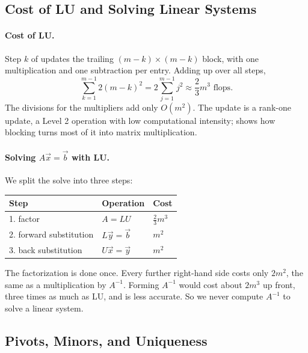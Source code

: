 \subsection{Cost of LU and Solving Linear Systems}

\paragraph{Cost of LU.} Step $k$ of  updates the trailing $(m - k) \times (m - k)$ block, with one multiplication and one subtraction per entry. Adding up over all steps,
\begin{equation}
  \sum_{k=1}^{m-1} 2(m - k)^2 = 2\sum_{j=1}^{m-1} j^2 \approx \frac{2}{3}m^3 \text{ flops.}
\end{equation}
The divisions for the multipliers add only $O(m^2)$. The update is a rank-one update, a Level 2 operation with low computational intensity;  shows how blocking turns most of it into matrix multiplication.

\paragraph{Solving $A\vec{x} = \vec{b}$ with LU.} We split the solve into three steps:
\begin{center}
\begin{tabular}{lll}
  \toprule
  Step & Operation & Cost \\
  \midrule
  1. factor & $A = LU$ & $\tfrac{2}{3}m^3$ \\
  2. forward substitution & $L\vec{y} = \vec{b}$ & $m^2$ \\
  3. back substitution & $U\vec{x} = \vec{y}$ & $m^2$ \\
  \bottomrule
\end{tabular}
\end{center}
The factorization is done once. Every further right-hand side costs only $2m^2$, the same as a multiplication by $A^{-1}$. Forming $A^{-1}$ would cost about $2m^3$ up front, three times as much as LU, and is less accurate. So we never compute $A^{-1}$ to solve a linear system.

\subsection{Pivots, Minors, and Uniqueness}

